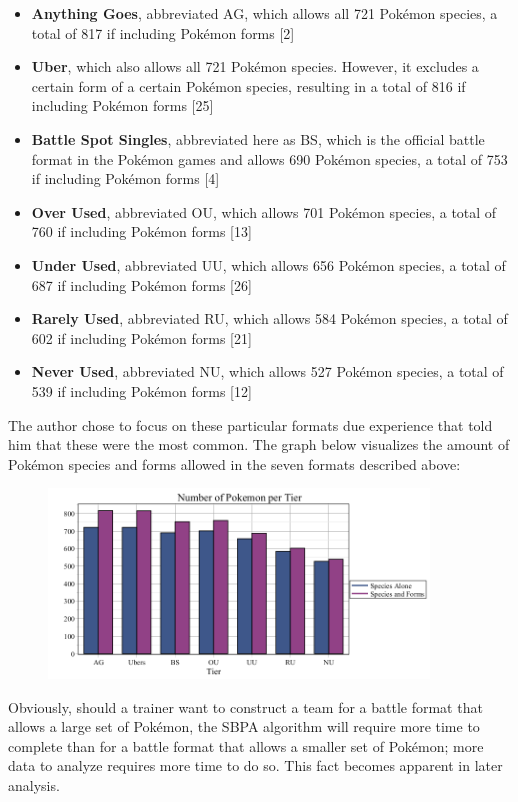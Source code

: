\documentclass{article}
\begin{document}
\begin{itemize}
	\item \textbf{Anything Goes}, abbreviated AG, which allows all 721 Pok\'emon species, a total of 817 if including Pok\'emon forms [2]
	\item \textbf{Uber}, which also allows all 721 Pok\'emon species. However, it excludes a certain form of a certain Pok\'emon species, resulting in a total of 816 if including Pok\'emon forms [25]
	\item \textbf{Battle Spot Singles}, abbreviated here as BS, which is the official battle format in the Pok\'emon games and allows 690 Pok\'emon species, a total of 753 if including Pok\'emon forms [4]
	\item \textbf{Over Used}, abbreviated OU, which allows 701 Pok\'emon species, a total of 760 if including Pok\'emon forms [13]
	\item \textbf{Under Used}, abbreviated UU, which allows 656 Pok\'emon species, a total of 687 if including Pok\'emon forms [26]
	\item \textbf{Rarely Used}, abbreviated RU, which allows 584 Pok\'emon species, a total of 602 if including Pok\'emon forms [21]
	\item \textbf{Never Used}, abbreviated NU, which allows 527 Pok\'emon species, a total of 539 if including Pok\'emon forms [12]
\end{itemize}
The author chose to focus on these particular formats due experience that told him that these were the most common.
The graph below visualizes the amount of Pok\'emon species and forms allowed in the seven formats described above:
\begin{figure}[H]
	\includegraphics[width=0.9\textwidth]{TierAmount.png}
	\centering
	\caption{}\label{TierAmountGraph}
\end{figure}
Obviously, should a trainer want to construct a team for a battle format that allows a large set of Pok\'emon, the SBPA algorithm will require more time to complete than for a battle format that allows a smaller set of Pok\'emon; more data  to analyze requires more time to do so. This fact becomes apparent in later analysis.\\\\
\end{document}
